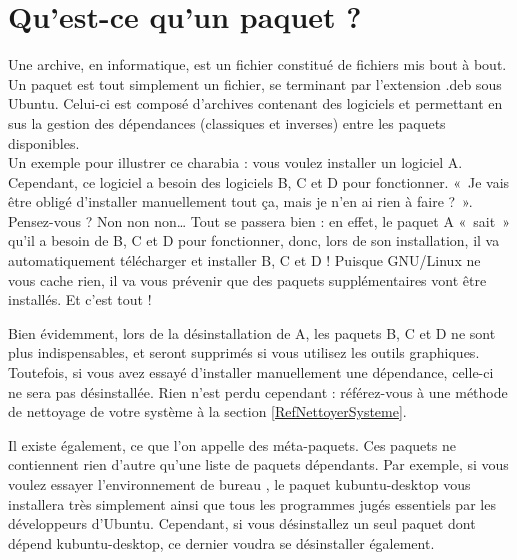 {\section{Qu'est-ce qu'un paquet ?}
Une archive, en informatique, est un fichier constitué de fichiers mis bout à bout. Un paquet est tout simplement un fichier, se terminant par l'extension .deb sous Ubuntu. Celui-ci est composé d'archives contenant des logiciels et permettant en sus la gestion des dépendances (classiques et inverses) entre les paquets disponibles.\\
Un exemple pour illustrer ce charabia : vous voulez installer un logiciel A. Cependant, ce logiciel a besoin des logiciels B, C et D pour fonctionner. «~Je vais être obligé d'installer manuellement tout ça, mais je n'en ai rien à faire ?~». Pensez-vous ? Non non non\ldots{} Tout se passera bien : en effet, le paquet A «~sait~» qu'il a besoin de B, C et D pour fonctionner, donc, lors de son installation, il va automatiquement télécharger et installer B, C et D ! Puisque GNU/Linux ne vous cache rien, il va vous prévenir que des paquets supplémentaires vont être installés. Et c'est tout !\par
Bien évidemment, lors de la désinstallation de A, les paquets B, C et D ne sont plus indispensables, et seront supprimés si vous utilisez les outils graphiques. Toutefois, si vous avez essayé d'installer manuellement une dépendance, celle-ci ne sera pas désinstallée. Rien n'est perdu cependant : référez-vous à une méthode de nettoyage de votre système à la section \ref{RefNettoyerSysteme}. 
\begin{nota}
Il existe également, ce que l'on appelle des méta-paquets. Ces paquets ne contiennent rien d'autre qu'une liste de paquets dépendants. Par exemple, si vous voulez essayer l'environnement de bureau , le paquet kubuntu-desktop vous installera très simplement  ainsi que tous les programmes  jugés essentiels par les développeurs d'Ubuntu. Cependant, si vous désinstallez un seul paquet dont dépend kubuntu-desktop, ce dernier voudra se désinstaller également.
\end{nota}
}
